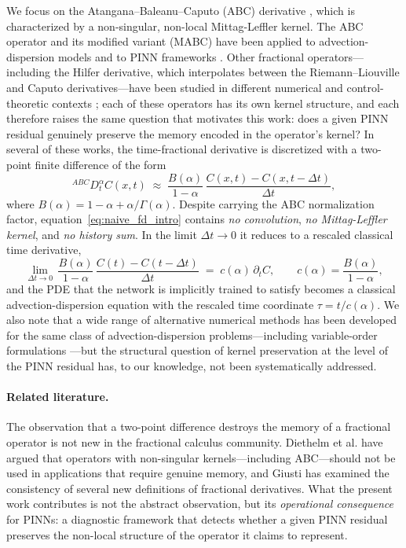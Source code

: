\documentclass[11pt]{article}
\begin{document}
We focus on the Atangana--Baleanu--Caputo (ABC) derivative \cite{Atangana2016}, which is characterized by a non-singular, non-local Mittag-Leffler kernel. The ABC operator and its modified variant (MABC) have been applied to advection-dispersion models \cite{AzZobi2025, Chawla2022} and to PINN frameworks \cite{AzZobi2025}. Other fractional operators---including the Hilfer derivative, which interpolates between the Riemann--Liouville and Caputo derivatives---have been studied in different numerical and control-theoretic contexts \cite{Zhu2025}; each of these operators has its own kernel structure, and each therefore raises the same question that motivates this work: does a given PINN residual genuinely preserve the memory encoded in the operator's kernel? In several of these works, the time-fractional derivative is discretized with a two-point finite difference of the form
\begin{equation}
{}^{ABC}D_t^\alpha C(x,t) \;\approx\; \frac{B(\alpha)}{1-\alpha}\,\frac{C(x,t)-C(x,t-\Delta t)}{\Delta t},
\label{eq:naive_fd_intro}
\end{equation}
where \(B(\alpha) = 1-\alpha+\alpha/\Gamma(\alpha)\). Despite carrying the ABC normalization factor, equation~\eqref{eq:naive_fd_intro} contains \emph{no convolution}, \emph{no Mittag-Leffler kernel}, and \emph{no history sum}. In the limit \(\Delta t \to 0\) it reduces to a rescaled classical time derivative,
\begin{equation}
\lim_{\Delta t\to 0}\, \frac{B(\alpha)}{1-\alpha}\,\frac{C(t)-C(t-\Delta t)}{\Delta t}
\;=\;
c(\alpha)\,\partial_t C, \qquad c(\alpha) = \frac{B(\alpha)}{1-\alpha},
\end{equation}
and the PDE that the network is implicitly trained to satisfy becomes a classical advection-dispersion equation with the rescaled time coordinate \(\tau = t/c(\alpha)\). We also note that a wide range of alternative numerical methods has been developed for the same class of advection-dispersion problems---including variable-order formulations \cite{Sadri2026}---but the structural question of kernel preservation at the level of the PINN residual has, to our knowledge, not been systematically addressed.

\paragraph{Related literature.}
The observation that a two-point difference destroys the memory of a fractional operator is not new in the fractional calculus community. Diethelm et al. \cite{Diethelm2020} have argued that operators with non-singular kernels---including ABC---should not be used in applications that require genuine memory, and Giusti \cite{Giusti2018} has examined the consistency of several new definitions of fractional derivatives. What the present work contributes is not the abstract observation, but its \emph{operational consequence} for PINNs: a diagnostic framework that detects whether a given PINN residual preserves the non-local structure of the operator it claims to represent.
\end{document}

